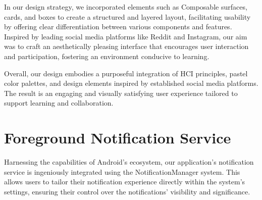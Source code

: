 In our design strategy, we incorporated elements such as Composable surfaces, cards, and boxes to create a structured and layered layout, facilitating usability by offering clear differentiation between various components and features. Inspired by leading social media platforms like Reddit and Instagram, our aim was to craft an aesthetically pleasing interface that encourages user interaction and participation, fostering an environment conducive to learning.

Overall, our design embodies a purposeful integration of HCI principles, pastel color palettes, and design elements inspired by established social media platforms. The result is an engaging and visually satisfying user experience tailored to support learning and collaboration.


\section{Foreground Notification Service}




Harnessing the capabilities of Android's ecosystem, our application's notification service is ingeniously integrated using the NotificationManager system. This allows users to tailor their notification experience directly within the system's settings, ensuring their control over the notifications' visibility and significance.

